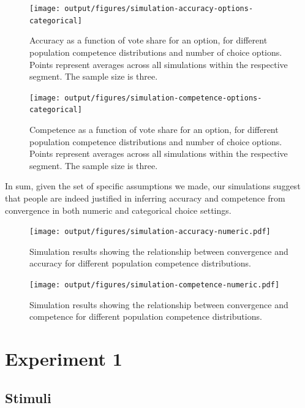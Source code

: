 \documentclass[
  doc,floatsintext]{apa6}
\begin{document}
\begin{figure}
\texttt{[image: output/figures/simulation-accuracy-options-categorical]} \caption{Accuracy as a function of vote share for an option, for different population competence distributions and number of choice options. Points represent averages across all simulations within the respective segment. The sample size is three.}\label{fig:simulation-accuracy-options-categorical}
\end{figure}



\begin{figure}
\texttt{[image: output/figures/simulation-competence-options-categorical]} \caption{Competence as a function of vote share for an option, for different population competence distributions and number of choice options. Points represent averages across all simulations within the respective segment. The sample size is three.}\label{fig:simulation-competence-options-categorical}
\end{figure}

In sum, given the set of specific assumptions we made, our simulations suggest that people are indeed justified in inferring accuracy and competence from convergence in both numeric and categorical choice settings.



\begin{figure}
\centering
\texttt{[image: output/figures/simulation-accuracy-numeric.pdf]}
\caption{\label{fig:simulation-accuracy-numeric}Simulation results showing the relationship between convergence and accuracy for different population competence distributions.}
\end{figure}



\begin{figure}
\centering
\texttt{[image: output/figures/simulation-competence-numeric.pdf]}
\caption{\label{fig:simulation-competence-numeric}Simulation results showing the relationship between convergence and competence for different population competence distributions.}
\end{figure}

\clearpage

\section{Experiment 1}\label{exp1}

\subsection{Stimuli}\label{stimuli}
\end{document}
